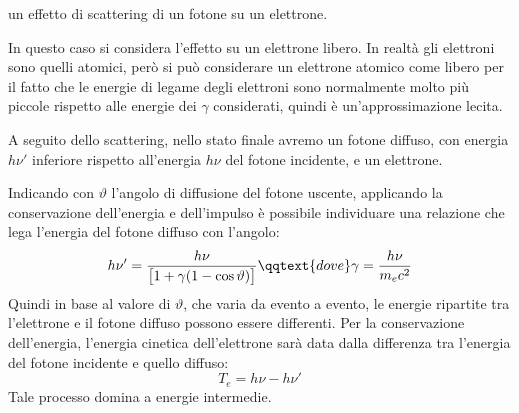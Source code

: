 \E un effetto di scattering di un fotone su un elettrone.

\begin{figure}[H]
    \centering
\end{figure}

In questo caso si considera l'effetto su un elettrone libero. In realtà gli elettroni sono quelli atomici, però si può considerare un elettrone atomico come libero per il fatto che le energie di legame degli elettroni sono normalmente molto più piccole rispetto alle energie dei $\gamma$ considerati, quindi è un'approssimazione lecita. 

A seguito dello scattering, nello stato finale avremo un fotone diffuso, con energia $h\nu'$ inferiore rispetto all'energia $h\nu$ del fotone incidente, e un elettrone.

Indicando con $\vartheta$ l'angolo di diffusione del fotone uscente, applicando la conservazione dell'energia e dell'impulso è possibile individuare una relazione che lega l'energia del fotone diffuso con l'angolo:
\begin{equation*}
    h\nu'=\frac{h\nu}{\big[1 + \gamma (1 - \cos{\vartheta})\big]}
    \qqtext{dove}
    \gamma=\frac{h\nu}{m_ec^2}
\end{equation*}
Quindi in base al valore di $\vartheta$, che varia da evento a evento, le energie ripartite tra l'elettrone e il fotone diffuso possono essere differenti.
Per la conservazione dell'energia, l'energia cinetica dell'elettrone sarà data dalla differenza tra l'energia del fotone incidente e quello diffuso:
\begin{equation*}
    T_e=h\nu - h\nu'
\end{equation*}
Tale processo domina a energie intermedie.

